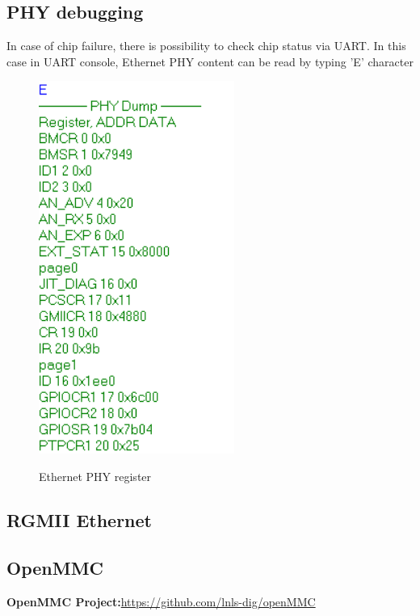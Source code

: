 \subsection{PHY debugging}

In case of chip failure, there is possibility to check chip status via UART. In this case in UART console, Ethernet PHY content can be read by typing 'E' character

	\begin{figure}[htbp!]
		\centering
		\includegraphics[scale=0.6]{img/phyreg.png}\\
		\caption{Ethernet PHY register } 
	\end{figure}

\subsection{RGMII Ethernet }


\subsection{OpenMMC}

\textbf{OpenMMC Project:}\href{https://github.com/lnls-dig/openMMC}{https://github.com/lnls-dig/openMMC}

